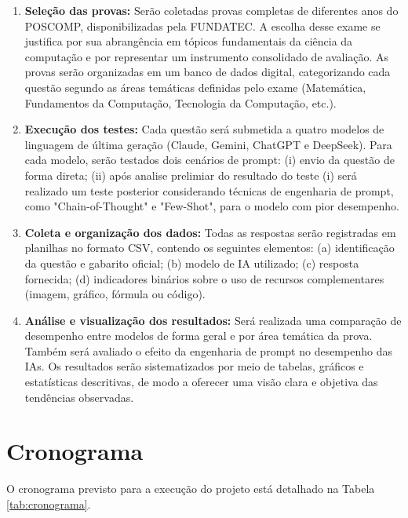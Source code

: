 \documentclass[brazilian, spanish, english]{RBIEarticle}
\begin{document}
\begin{enumerate}
    \item \textbf{Seleção das provas:} Serão coletadas provas completas de diferentes anos do POSCOMP, disponibilizadas pela FUNDATEC. A escolha desse exame se justifica por sua abrangência em tópicos fundamentais da ciência da computação e por representar um instrumento consolidado de avaliação. As provas serão organizadas em um banco de dados digital, categorizando cada questão segundo as áreas temáticas definidas pelo exame (Matemática, Fundamentos da Computação, Tecnologia da Computação, etc.).

    \item \textbf{Execução dos testes:} Cada questão será submetida a quatro modelos de linguagem de última geração (Claude, Gemini, ChatGPT e DeepSeek). Para cada modelo, serão testados dois cenários de prompt: (i) envio da questão de forma direta; (ii) após analise prelimiar do resultado do teste (i) será realizado um teste posterior considerando técnicas de engenharia de prompt, como "Chain-of-Thought" e "Few-Shot", para o modelo com pior desempenho.

    \item \textbf{Coleta e organização dos dados:} Todas as respostas serão registradas em planilhas no formato CSV, contendo os seguintes elementos: (a) identificação da questão e gabarito oficial; (b) modelo de IA utilizado; (c) resposta fornecida; (d) indicadores binários sobre o uso de recursos complementares (imagem, gráfico, fórmula ou código).

    \item \textbf{Análise e visualização dos resultados:} Será realizada uma comparação de desempenho entre modelos de forma geral e por área temática da prova. Também será avaliado o efeito da engenharia de prompt no desempenho das IAs. Os resultados serão sistematizados por meio de tabelas, gráficos e estatísticas descritivas, de modo a oferecer uma visão clara e objetiva das tendências observadas.
\end{enumerate}

\section{Cronograma}

O cronograma previsto para a execução do projeto está detalhado na Tabela \ref{tab:cronograma}.
\end{document}

